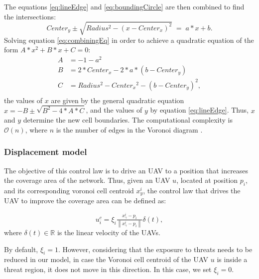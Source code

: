 The equations \eqref{eq:lineEdge} and \eqref{eq:boundingCircle} are then combined to find the intersections:  
\begin{equation} \label{eq:combiningEq}
Center_y \pm \sqrt{Radius^2 - {(x-Center_x)^2}} \; = \;  a*x+b.
\end{equation}
Solving equation \eqref{eq:combiningEq} in order to achieve a quadratic equation of the form  
$A*x^2+B*x+C=0$:
\begin{align}
A&=-1-a^2 \nonumber \\
B&=2*Center_x-2*a*(b-Center_y) \nonumber \\
C&=Radius^2-Center{_x}{^2}-(b-Center_y)^2, \nonumber\\
\end{align}
the values of $x$ are given by the general quadratic equation 
$x=-B\pm \sqrt{B^2-4*A*C}$, and the values of $y$ by equation \eqref{eq:lineEdge}. Thus, $x$ and $y$ determine the new cell boundaries. The computational complexity is $\mathcal{O}(n)$, where $n$ is the number of edges in the Voronoi diagram \cite{sang_2015}.  

\subsubsection{Displacement model}

The objective of this control law is to drive an UAV  to a position that increases the coverage area of the network. Thus, given an UAV $u$, located at position $p_i$, and its corresponding voronoi cell centroid $x_y^i$, the control law that drives the UAV to improve the coverage area can be defined as:

\begin{equation}
u_i^c = \xi_i\tfrac{x_\gamma^i - p_i}{\left\| x_\gamma^i - p_i \right\|}\delta\left(t\right),
\label{eq:controllawCoverage}
\end{equation}
where $\delta\left(t\right)\in\mathbb{R}$ is the linear velocity of the UAVs.

By default, $\xi_i=1$. However, considering that the exposure to threats needs to be reduced in our model, in case the Voronoi cell centroid of the UAV $u$ is inside a threat region, it does not move in this direction. In this case, we set $\xi_i=0$.